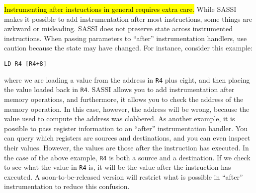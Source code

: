 {\hl{Instrumenting after instructions in general requires extra care.}}
While SASSI makes it possible to add instrumentation after most
instructions, some things are awkward or misleading. SASSI does not
preserve state across instrumented instructions. When passing
parameters to ``after'' instrumentation handlers, use caution because
the state may have changed. For instance, consider this example:
\begin{verbatim}
LD R4 [R4+8]
\end{verbatim}
where we are loading a value from the address in \texttt{R4} plus
eight, and then placing the value loaded back in \texttt{R4}. SASSI
allows you to add instrumentation after memory operations, and
furthermore, it allows you to check the address of the memory
operation. In this case, however, the address will be wrong, because
the value used to compute the address was clobbered. As another
example, it is possible to pass register information to an ``after''
instrumentation handler. You can query which registers are sources and
destinations, and you can even inspect their values. However, the
values are those after the instruction has executed. In the case of
the above example, \texttt{R4} is both a source and a destination. If we check
to see what the value in \texttt{R4} is, it will be the value after the
instruction has executed. A soon-to-be-released version will restrict
what is possible in ``after'' instrumentation to reduce this
confusion.
